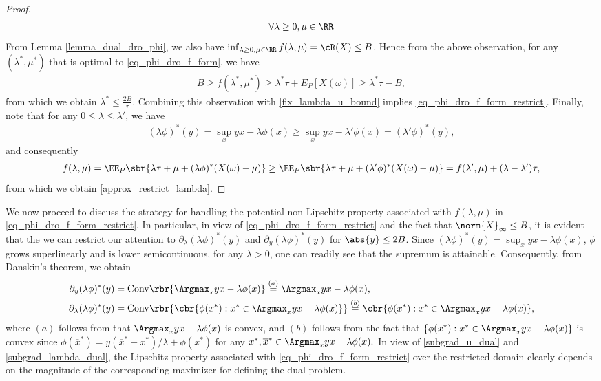 \documentclass[9pt]{article} %
\numberwithin{equation}{section}
\renewcommand{\frac}[2]{\tfrac{#1}{#2}}
\begin{document}
\begin{proof}
\begin{align*}
\forall \lambda \geq 0, \mu \in \RR
\end{align*}
From Lemma \ref{lemma_dual_dro_phi}, we also have 
$\inf_{\lambda \geq 0, \mu \in \RR} f(\lambda,  \mu) = \cR(X) \leq B$.
Hence from the above observation, for any $(\lambda^*, \mu^*)$ that is optimal to \eqref{eq_phi_dro_f_form}, we have 
\begin{align*}
B \geq f(\lambda^*, \mu^*) \geq \lambda^* \tau + E_P [X(\omega)] \geq \lambda^* \tau - B,
\end{align*}
from which we obtain $\lambda^* \leq \frac{2B}{\tau}$. 
Combining this observation with \eqref{fix_lambda_u_bound} implies \eqref{eq_phi_dro_f_form_restrict}.
Finally, note that for any $0 \leq \lambda \leq \lambda'$, we have
\begin{align*}
(\lambda \phi)^*(y) = \sup_{x} y x - \lambda \phi(x) \geq \sup_{x} y x - \lambda' \phi(x) = (\lambda' \phi)^*(y),
\end{align*}
and consequently 
\begin{align*}
f(\lambda, \mu) = \EE_P \sbr{\lambda \tau + \mu + (\lambda \phi)^* (X(\omega) - \mu)} 
\geq 
 \EE_P \sbr{\lambda \tau + \mu + (\lambda' \phi)^* (X(\omega) - \mu)} 
 = f(\lambda', \mu) + (\lambda - \lambda') \tau,
\end{align*}
from which we obtain \eqref{approx_restrict_lambda}.
\end{proof}




We now proceed to discuss the strategy for handling the potential non-Lipschitz property associated with $f(\lambda, \mu)$ in \eqref{eq_phi_dro_f_form_restrict}. 
In particular, 
in view of \eqref{eq_phi_dro_f_form_restrict} and the fact that $\norm{X}_\infty \leq B$, 
it is evident that the we can restrict our attention to $\partial_\lambda (\lambda \phi)^*(y)$ 
and $\partial_y (\lambda \phi)^*(y)$ 
for $\abs{y} \leq 2B$. 
Since
$
(\lambda \phi)^*(y) = \sup_{x} yx - \lambda \phi(x) 
$,
 $\phi$ grows superlinearly and is lower semicontinuous, 
for any $\lambda > 0$, one can readily see that the supremum is attainable. 
Consequently, from Danskin's theorem, we obtain 
\begin{align}
\partial_y (\lambda \phi)^*(y) &  = \mathrm{Conv} \rbr{\Argmax_x yx - \lambda \phi(x) } \overset{(a)}{=} \Argmax_x yx - \lambda \phi(x),  
\label{subgrad_u_dual}
\\
\partial_\lambda (\lambda \phi)^*(y) & = \mathrm{Conv} \rbr{\cbr{\phi(x^*): x^* \in \Argmax_{x} yx - \lambda \phi(x) }} 
\overset{(b)}{=} \cbr{\phi(x^*): x^* \in \Argmax_{x} yx - \lambda \phi(x) },
\label{subgrad_lambda_dual}
\end{align}
where $(a)$ follows from that $\Argmax_x yx - \lambda \phi(x)$ is convex,
and $(b)$ follows from  the fact that 
$
\{\phi(x^*): x^* \in \Argmax_{x} yx - \lambda \phi(x) \}
$ is convex
since
$
  \phi(\overline{x}^*)  = y (\overline{x}^* - x^*) / \lambda + \phi(x^*) 
$ 
for any $x^*, \overline{x}^* \in \Argmax_{x} yx - \lambda \phi(x).$
In view of \eqref{subgrad_u_dual} and \eqref{subgrad_lambda_dual}, the Lipschitz property associated with \eqref{eq_phi_dro_f_form_restrict} over the restricted domain clearly depends on the magnitude of the corresponding maximizer for defining the dual problem. 
\end{document}
